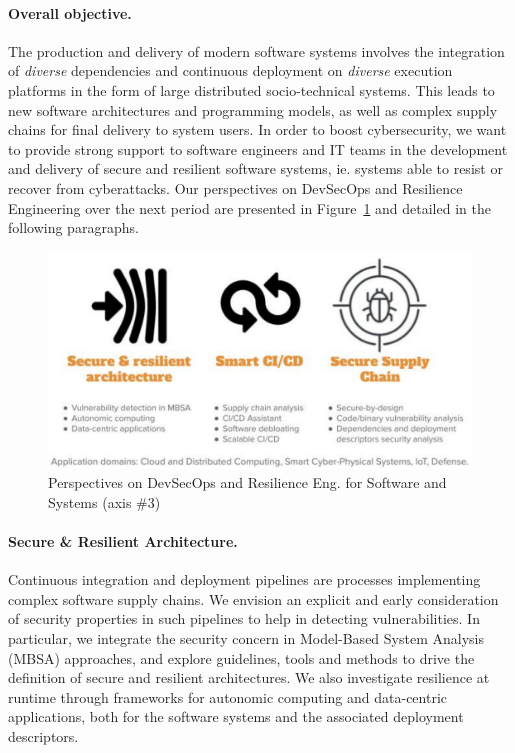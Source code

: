\paragraph{Overall objective.} The production and delivery of modern software systems involves the integration of \emph{diverse} dependencies and continuous deployment on \emph{diverse} execution platforms in the form of large distributed socio-technical systems. 
This leads to new software architectures and programming models, as well as complex supply chains for final delivery to system users. 
In order to boost cybersecurity, we want to provide strong support to software engineers and IT teams in the development and delivery of secure and resilient software systems, ie. systems able to resist or recover from cyberattacks.
Our perspectives on DevSecOps and Resilience Engineering over the next period are presented in Figure~\ref{fig:perspectives-devsecops} and detailed in the following paragraphs.


\begin{figure}[ht]
\centering
\includegraphics[width=.8\columnwidth]{IMG/devsecops.pdf}
\caption{Perspectives on DevSecOps and Resilience Eng. for Software and Systems (axis \#3)}
\label{fig:perspectives-devsecops}
\end{figure}

\paragraph{Secure \& Resilient Architecture.} Continuous integration and deployment pipelines are processes implementing complex software supply chains. We envision an explicit and early consideration of security properties in such pipelines to help in detecting vulnerabilities. In particular, we integrate the security concern in Model-Based System Analysis (MBSA) approaches, and explore guidelines, tools and methods to drive the definition of secure and resilient architectures. We also investigate resilience at runtime through frameworks for autonomic computing and data-centric applications, both for the software systems and the associated deployment descriptors. 

